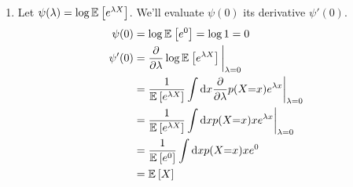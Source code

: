 \documentclass[11pt]{article}
\newcommand{\1}{\mathbb{I}} %
\begin{document}
\begin{enumerate}
	\item Let $\psi(\lambda) = \log \mathbb{E}_{}\left[e^{\lambda X}\right]$. We'll evaluate $\psi(0)$ its derivative $\psi'(0)$. 
	\begin{align}
		\psi(0)
			&= \log \mathbb{E}_{}\left[e^{0}\right] = \log 1 = 0 \\
		\psi'(0) 
			&= \frac{\partial }{\partial \lambda} \log \mathbb{E}_{}\left[e^{\lambda X}\right] \bigg|_{\lambda {=} 0} \\
			&= \frac{1}{\mathbb{E}_{}\left[e^{\lambda X}\right] } \int \mathrm{d}x \frac{\partial }{\partial \lambda}  p(X{=} x) e^{\lambda x} \bigg|_{\lambda {=} 0} \\
			&= \frac{1}{\mathbb{E}_{}\left[e^{\lambda X}\right] } \int \mathrm{d}x  p(X{=} x) x e^{\lambda x} \bigg|_{\lambda {=} 0} \\
			&= \frac{1}{\mathbb{E}_{}\left[e^{0}\right] } \int \mathrm{d}x  p(X{=} x) x e^{0} \\
			&= \mathbb{E}_{}\left[X\right]
	\end{align}


\end{enumerate}
\end{document}
